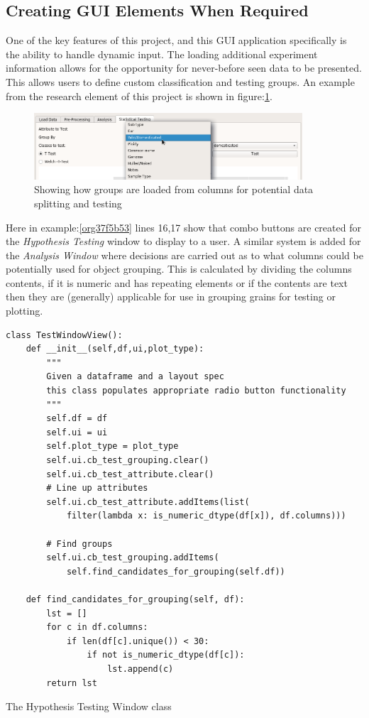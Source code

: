 \documentclass[11pt]{report}
\begin{document}
\subsection{Creating GUI Elements When Required}
\label{sec:org43c1749}

One of the key features of this project, and this GUI application specifically is the ability to handle dynamic input. The loading additional experiment information allows for the opportunity for never-before seen data to be presented. This allows users to define custom classification and testing groups. An example from the research element of this project is shown in figure:\ref{fig:orgd945013}.

\begin{figure}[htbp]
\centering
\includegraphics[width=10cm]{./images/dynamicselection.png}
\caption{\label{fig:orgd945013}
Showing how groups are loaded from columns for potential data splitting and testing}
\end{figure}

Here in example:\ref{org37f5b53} lines 16,17 show that combo buttons are created for the \emph{Hypothesis Testing} window to display to a user. A similar system is added for the \emph{Analysis Window} where decisions are carried out as to what columns could be potentially used for object grouping. This is calculated by dividing the columns contents, if it is numeric and has repeating elements or if the contents are text then they are (generally) applicable for use in grouping grains for testing or plotting.

\begin{listing}[htbp]
\begin{verbatim}
class TestWindowView():
    def __init__(self,df,ui,plot_type):
        """
        Given a dataframe and a layout spec
        this class populates appropriate radio button functionality
        """
        self.df = df
        self.ui = ui
        self.plot_type = plot_type
        self.ui.cb_test_grouping.clear()
        self.ui.cb_test_attribute.clear()
        # Line up attributes
        self.ui.cb_test_attribute.addItems(list(
            filter(lambda x: is_numeric_dtype(df[x]), df.columns)))

        # Find groups
        self.ui.cb_test_grouping.addItems(
            self.find_candidates_for_grouping(self.df))

    def find_candidates_for_grouping(self, df):
        lst = []
        for c in df.columns:
            if len(df[c].unique()) < 30:
                if not is_numeric_dtype(df[c]):
                    lst.append(c)
        return lst
\end{verbatim}
\caption{\label{org37f5b53}
The Hypothesis Testing Window class}
\end{listing}
\end{document}
